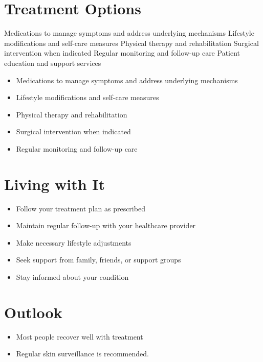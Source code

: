 \section{Treatment Options}
Medications to manage symptoms and address underlying mechanisms Lifestyle modifications and self-care measures Physical therapy and rehabilitation Surgical intervention when indicated Regular monitoring and follow-up care Patient education and support services

\begin{itemize}[noitemsep]
  \item Medications to manage symptoms and address underlying mechanisms
  \item Lifestyle modifications and self-care measures
  \item Physical therapy and rehabilitation
  \item Surgical intervention when indicated
  \item Regular monitoring and follow-up care
\end{itemize}
\section{Living with It}
\begin{itemize}[noitemsep]
  \item Follow your treatment plan as prescribed
  \item Maintain regular follow-up with your healthcare provider
  \item Make necessary lifestyle adjustments
  \item Seek support from family, friends, or support groups
  \item Stay informed about your condition
\end{itemize}
\section{Outlook}
\begin{itemize}[noitemsep]
  \item Most people recover well with treatment
  \item Regular skin surveillance is recommended.
\end{itemize}
